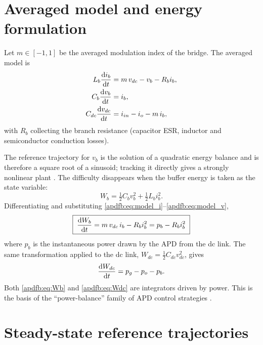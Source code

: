 \section{Averaged model and energy formulation}

Let $m\in[-1,1]$ be the averaged modulation index of the bridge. The averaged
model is
\begin{align}
L_b\frac{\mathrm{d} i_b}{\mathrm{d} t} &= m\,v_{dc} - v_b - R_b i_b, \label{apdfb:eq:model_i}\\
C_b\frac{\mathrm{d} v_b}{\mathrm{d} t} &= i_b, \label{apdfb:eq:model_v}\\
C_{dc}\frac{\mathrm{d} v_{dc}}{\mathrm{d} t} &= i_{in} - i_o - m\,i_b, \label{apdfb:eq:model_vdc}
\end{align}
with $R_b$ collecting the branch resistance (capacitor ESR, inductor and
semiconductor conduction losses).

The reference trajectory for $v_b$ is the solution of a quadratic energy balance
and is therefore a square root of a sinusoid; tracking it directly gives a
strongly nonlinear plant \cite{yuan2019nonlinear}. The difficulty disappears
when the buffer energy is taken as the state variable:
\begin{equation}
W_b = \tfrac12 C_b v_b^2 + \tfrac12 L_b i_b^2 .
\end{equation}
Differentiating and substituting \eqref{apdfb:eq:model_i}--\eqref{apdfb:eq:model_v},
\begin{equation}
\boxed{\;\frac{\mathrm{d} W_b}{\mathrm{d} t} = m\,v_{dc}\,i_b - R_b i_b^2 = p_b - R_b i_b^2\;}
\label{apdfb:eq:Wb}
\end{equation}
where $p_b$ is the instantaneous power drawn by the APD from the dc link. The
same transformation applied to the dc link, $W_{dc}=\tfrac12 C_{dc}v_{dc}^2$,
gives
\begin{equation}
\frac{\mathrm{d} W_{dc}}{\mathrm{d} t} = p_g - p_o - p_b .
\label{apdfb:eq:Wdc}
\end{equation}
Both \eqref{apdfb:eq:Wb} and \eqref{apdfb:eq:Wdc} are integrators driven by power. This is
the basis of the ``power-balance'' family of APD control strategies
\cite{liu2021review,wang2011ripple}.

\section{Steady-state reference trajectories}

